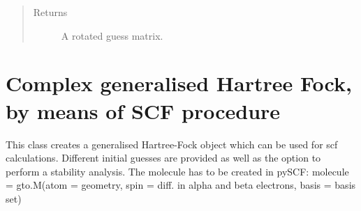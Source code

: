 \documentclass[letterpaper,10pt,english]{sphinxmanual}
\begin{document}
\begin{fulllineitems}
\begin{fulllineitems}
\begin{sphinxVerbatim}[commandchars=\\\{\}]
          
   
  
\end{sphinxVerbatim}
\begin{quote}\begin{description}
\item[{Returns}] \leavevmode
A rotated guess matrix.

\end{description}\end{quote}

\end{fulllineitems}


\end{fulllineitems}

\label{\detokenize{Complex_GHF:module-ghf.complex_GHF}}

\chapter{Complex generalised Hartree Fock, by means of SCF procedure}
\label{\detokenize{Complex_GHF:complex-generalised-hartree-fock-by-means-of-scf-procedure}}\label{\detokenize{Complex_GHF::doc}}
This class creates a generalised Hartree-Fock object which can be used for scf calculations. Different initial guesses
are provided as well as the option to perform a stability analysis.
The molecule has to be created in pySCF:
molecule = gto.M(atom = geometry, spin = diff. in alpha and beta electrons, basis = basis set)
\end{document}

